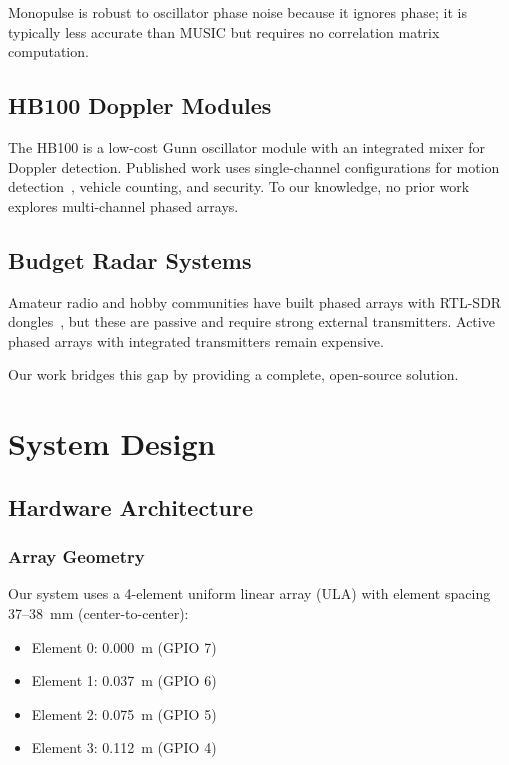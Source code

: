 \documentclass[10pt,a4paper]{article}
\begin{document}
Monopulse is robust to oscillator phase noise because it ignores phase; it is typically less
accurate than MUSIC but requires no correlation matrix computation.

\subsection{HB100 Doppler Modules}

The HB100 is a low-cost Gunn oscillator module with an integrated mixer for Doppler detection.
Published work uses single-channel configurations for motion detection~\cite{HB100Datasheet},
vehicle counting, and security. To our knowledge, no prior work explores multi-channel phased arrays.

\subsection{Budget Radar Systems}

Amateur radio and hobby communities have built phased arrays with RTL-SDR dongles~\cite{VanTrees2002},
but these are passive and require strong external transmitters. Active phased arrays with integrated
transmitters remain expensive.

Our work bridges this gap by providing a complete, open-source solution.

\section{System Design}
\label{sec:design}

\subsection{Hardware Architecture}

\subsubsection{Array Geometry}

Our system uses a 4-element uniform linear array (ULA) with element spacing 37--38~mm
(center-to-center):

\begin{itemize}
\item Element 0: 0.000~m (GPIO 7)
\item Element 1: 0.037~m (GPIO 6)
\item Element 2: 0.075~m (GPIO 5)
\item Element 3: 0.112~m (GPIO 4)
\end{itemize}
\end{document}
